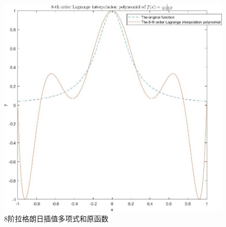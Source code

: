 \documentclass[10pt,a4paper]{article}
\begin{document}
\begin{figure}[H]
\centering
\includegraphics[scale=.4]{1_1_4.jpg}
\caption{8阶拉格朗日插值多项式和原函数}
\end{figure}
\end{document}
